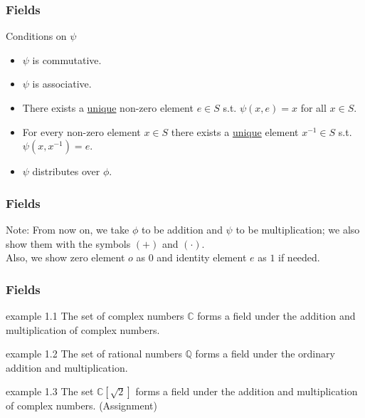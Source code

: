 \documentclass{beamer}
\begin{document}
\begin{frame}
    \frametitle{Fields}
\begin{block}{Conditions on $\psi$}
    \begin{itemize}
        \item $\psi$ is commutative.
        \item <2->$\psi$ is associative.
        \item <3->There exists a \underline{unique} non-zero element $e \in S$ s.t. $\psi(x,e) = x$ for all $x \in S$.
        \item <4->For every non-zero element $x \in S$ there exists a \underline{unique} element $x^{-1} \in S$ s.t. $\psi(x,x^{-1}) = e$.
        \item <5->$\psi$ distributes over $\phi$.
    \end{itemize}
\end{block}
\end{frame}

\begin{frame}
    \frametitle{Fields}
Note: From now on, we take $\phi$ to be addition and $\psi$ to be multiplication; we also show them with the symbols $(+)$ and $(\cdot)$.\\
Also, we show zero element $o$ as $0$ and identity element $e$ as $1$ if needed.
\end{frame}

\begin{frame}
    \frametitle{Fields}

    \begin{exampleblock}{example 1.1}
        The set of complex numbers $\mathbb{C}$ forms a field under the addition and multiplication of complex numbers.
    \end{exampleblock}

    \begin{exampleblock}{example 1.2}
        The set of rational numbers $\mathbb{Q}$ forms a field under the ordinary addition and multiplication.
    \end{exampleblock}

    \begin{exampleblock}{example 1.3}
        The set $\mathbb{C}[\sqrt{2}]$ forms a field under the addition and multiplication of complex numbers. (Assignment)
    \end{exampleblock}

\end{frame}
\end{document}
